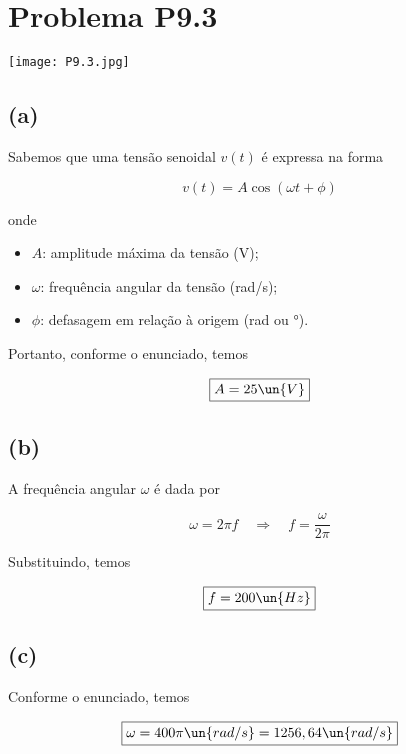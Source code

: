 
\section*{Problema P9.3}

\renewcommand*\thesection{9.3}

\begin{center}
    \texttt{[image: P9.3.jpg]}
\end{center}

\subsection*{(a)}

Sabemos que uma tensão senoidal $v(t)$ é expressa na forma


\begin{equation}\label{eq:9.3.1}
    v(t) = A\cos\left(\omega t + \phi\right)
\end{equation}

onde

\begin{itemize}
    \item $A$: amplitude máxima da tensão (V);
    \item $\omega$: frequência angular da tensão (rad/s);
    \item $\phi$: defasagem em relação à origem (rad ou °).
\end{itemize}

Portanto, conforme o enunciado, temos

\[ \boxed{A = 25 \un{V}}  \]

\subsection*{(b)}

A frequência angular $\omega$ é dada por

\[ \omega = 2\pi f \quad \Rightarrow \quad f = \frac{\omega}{2\pi} \]

Substituindo, temos

\[ \boxed{f = 200 \un{Hz}}  \]

\subsection*{(c)}

Conforme o enunciado, temos

\[ \boxed{\omega = 400\pi \un{rad/s} = 1256,64 \un{rad/s}}  \]

